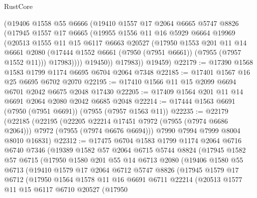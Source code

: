 \begin{lexlean}{RustCore}
\begin{coremodule}
          (@19406
            @1558
            @55
            @6666
            (@19410
              @1557
              @17
              @2064
              @6665
              @5747
              @8826
              (@17945
                @1557
                @17
                @6665
                (@19955
                  @1556
                  @11
                  @16
                  @5929
                  @6664
                  @19969
                  (@20513
                    @1555
                    @11
                    @15
                    @6117
                    @6663
                    @20527
                    (@17950
                      @1553
                      @201
                      @11
                      @14
                      @6661
                      @2080
                      (@17444 @1552 @6661 (@7950 (@7951 @6661)) (@7955 (@7957 @1552 @11)))
                      @17983))))
              @19450))
          @17983))
      @19459)
@22179 := @17390 @1568 @1583 @1799 @1174 @6695 @6704 @2064 @7348
@22185 := @17401 @1567 @16 @25 @6695 @6702 @2070
@22195 := @17410 @1566 @11 @15 @2099 @6694 @6701 @2042 @6675 @2048 @17430
@22205 := @17409 @1564 @201 @11 @14 @6691 @2064 @2080 @2042 @6685 @2048
@22214 := @17444 @1563 @6691 (@7950 (@7951 @6691)) (@7955 (@7957 @1563 @11))
@22235 := @22179
    (@22185
      (@22195
        (@22205 @22214 @17451 @7972 (@7955 (@7974 @6686 @2064)))
        @7972
        (@7955 (@7974 @6676 @6694)))
      @7990
      @7994
      @7999
      @8004
      @8010
      @16831)
@22312 := @17475
    @6704
    @1583
    @1799
    @1174
    @2064
    @6716
    @6740
    @7346
    (@19389
      @1582
      @57
      @2064
      @6715
      @5744
      @8824
      (@17945
        @1582
        @57
        @6715
        (@17950
          @1580
          @201
          @55
          @14
          @6713
          @2080
          (@19406
            @1580
            @55
            @6713
            (@19410
              @1579
              @17
              @2064
              @6712
              @5747
              @8826
              (@17945
                @1579
                @17
                @6712
                (@17950
                  @1564
                  @1578
                  @11
                  @16
                  @6691
                  @6711
                  @22214
                  (@20513
                    @1577
                    @11
                    @15
                    @6117
                    @6710
                    @20527
                    (@17950

\end{coremodule}
\end{lexlean}
